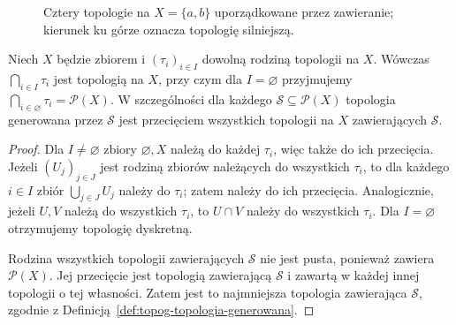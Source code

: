 \begin{figure}[ht]
\centering
{}
\caption{Cztery topologie na $X=\{a,b\}$ uporządkowane
przez zawieranie; kierunek ku górze oznacza topologię silniejszą.}
\label{fig:topog-cztery-topologie}
\end{figure}

\begin{twierdzenie}
\label{thm:topog-przeciecia-topologii}
Niech $X$ będzie zbiorem i $(\tau_i)_{i\in I}$
dowolną rodziną topologii na $X$. Wówczas
$\bigcap_{i\in I}\tau_i$ jest topologią na $X$,
przy czym dla $I=\varnothing$ przyjmujemy
$\bigcap_{i\in\varnothing}\tau_i=\mathcal P(X)$.
W szczególności dla każdego
$\mathcal S\subseteq\mathcal P(X)$ topologia
generowana przez $\mathcal S$ jest przecięciem
wszystkich topologii na $X$ zawierających $\mathcal S$.
\end{twierdzenie}
\begin{proof}
Dla $I\neq\varnothing$ zbiory $\varnothing,X$
należą do każdej $\tau_i$, więc także do ich przecięcia.
Jeżeli $(U_j)_{j\in J}$ jest rodziną zbiorów należących
do wszystkich $\tau_i$, to dla każdego $i\in I$
zbiór $\bigcup_{j\in J}U_j$ należy do $\tau_i$;
zatem należy do ich przecięcia. Analogicznie,
jeżeli $U,V$ należą do wszystkich $\tau_i$, to
$U\cap V$ należy do wszystkich $\tau_i$.
Dla $I=\varnothing$ otrzymujemy topologię dyskretną.

Rodzina wszystkich topologii zawierających $\mathcal S$
nie jest pusta, ponieważ zawiera $\mathcal P(X)$.
Jej przecięcie jest topologią zawierającą $\mathcal S$
i zawartą w każdej innej topologii o tej własności.
Zatem jest to najmniejsza topologia zawierająca
$\mathcal S$, zgodnie z Definicją~\ref{def:topog-topologia-generowana}.
\end{proof}

